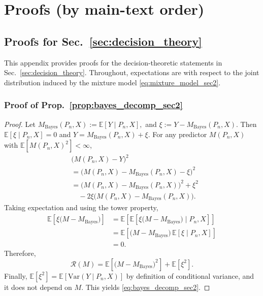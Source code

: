\documentclass{article}
\theoremstyle{plain}
\theoremstyle{definition}
\theoremstyle{remark}
\begin{document}
\section{Proofs (by main-text order)}
\subsection{Proofs for Sec.~\ref{sec:decision_theory}}\label{app:sec2_proofs}

This appendix provides proofs for the decision-theoretic statements in Sec.~\ref{sec:decision_theory}. Throughout, expectations are with respect to the joint distribution induced by the mixture model \eqref{eq:mixture_model_sec2}.

\subsubsection{Proof of Prop.~\ref{prop:bayes_decomp_sec2}}
\label{app:proof_bayes_decomp}

\begin{proof}
Let
$M_{\mathrm{Bayes}}(P_n,X) := \mathbb{E}[Y\mid P_n,X],
$ and $
\xi := Y - M_{\mathrm{Bayes}}(P_n,X)$.
Then $\mathbb{E}[\xi\mid P_n,X]=0$ and $Y=M_{\mathrm{Bayes}}(P_n,X)+\xi$.
For any predictor $M(P_n,X)$ with $\mathbb{E}[M(P_n,X)^2]<\infty$,
\begin{align*}
&\bigl(M(P_n,X)-Y\bigr)^2 \\
&= \bigl(M(P_n,X)-M_{\mathrm{Bayes}}(P_n,X)-\xi\bigr)^2 \\
&= \bigl(M(P_n,X)-M_{\mathrm{Bayes}}(P_n,X)\bigr)^2
   + \xi^2\\
&\quad - 2\xi\bigl(M(P_n,X)-M_{\mathrm{Bayes}}(P_n,X)\bigr).
\end{align*}
Taking expectation and using the tower property,
\begin{align*}
\mathbb{E}\!\left[\xi\bigl(M-M_{\mathrm{Bayes}}\bigr)\right]
&=
\mathbb{E}\!\left[\mathbb{E}\!\left[\xi\bigl(M-M_{\mathrm{Bayes}}\bigr)\mid P_n,X\right]\right]\\
&=
\mathbb{E}\!\left[\bigl(M-M_{\mathrm{Bayes}}\bigr)\,\mathbb{E}[\xi\mid P_n,X]\right]\\
&=0.
\end{align*}
Therefore,
\[
\mathcal{R}(M)
=
\mathbb{E}\!\left[\bigl(M-M_{\mathrm{Bayes}}\bigr)^2\right]
+
\mathbb{E}\!\left[\xi^2\right].
\]
Finally, $\mathbb{E}[\xi^2]=\mathbb{E}[\mathrm{Var}(Y\mid P_n,X)]$ by definition of conditional variance, and it does
not depend on $M$. This yields \eqref{eq:bayes_decomp_sec2}.
\end{proof}
\end{document}
